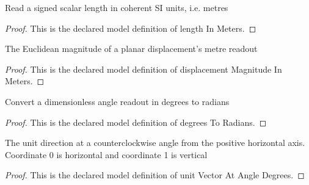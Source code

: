 \begin{definition}
  \label{def:physics:phyx-mini-0678:phyxminiproblems-problemphyxmini0678-lengthinmeters}
  Read a signed scalar length in coherent SI units, i.e. metres
\end{definition}
\begin{proof}
  This is the declared model definition of length In Meters.
\end{proof}
\begin{definition}
  \label{def:physics:phyx-mini-0678:phyxminiproblems-problemphyxmini0678-displacementmagnitudeinmeters}
  The Euclidean magnitude of a planar displacement's metre readout
\end{definition}
\begin{proof}
  This is the declared model definition of displacement Magnitude In Meters.
\end{proof}
\begin{definition}
  \label{def:physics:phyx-mini-0678:phyxminiproblems-problemphyxmini0678-degreestoradians}
  Convert a dimensionless angle readout in degrees to radians
\end{definition}
\begin{proof}
  This is the declared model definition of degrees To Radians.
\end{proof}
\begin{definition}
  \label{def:physics:phyx-mini-0678:phyxminiproblems-problemphyxmini0678-unitvectoratangledegrees}
  The unit direction at a counterclockwise angle from the positive horizontal axis. Coordinate 0 is horizontal and coordinate 1 is vertical
\end{definition}
\begin{proof}
  This is the declared model definition of unit Vector At Angle Degrees.
\end{proof}
